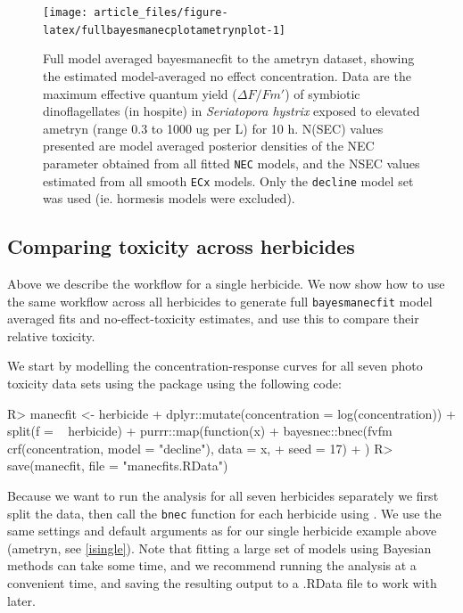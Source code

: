\documentclass[
  shortnames]{jss}
\begin{document}
\begin{CodeChunk}
\begin{figure}[!ht]

{\centering \texttt{[image: article\_files/figure-latex/fullbayesmanecplotametrynplot-1]} 

}

\caption{Full model averaged bayesmanecfit to the ametryn dataset, showing the estimated model-averaged no effect concentration. Data are the maximum effective quantum yield ($\Delta F / Fm'$) of symbiotic dinoflagellates (in hospite) in \textit{Seriatopora hystrix} exposed to elevated ametryn (range 0.3 to 1000 ug per L) for 10 h. N(SEC) values presented are model averaged posterior densities of the NEC parameter obtained from all fitted \texttt{NEC} models, and the NSEC values estimated from all smooth \texttt{ECx} models. Only the \texttt{decline} model set was used (ie. hormesis models were excluded).}\label{fig:fullbayesmanecplotametrynplot}
\end{figure}
\end{CodeChunk}

\subsection[Comparing toxicity]{Comparing toxicity across herbicides}\label{iall}

Above we describe the workflow for a single herbicide. We now show how to use the same workflow across all herbicides to generate full \texttt{bayesmanecfit} model averaged fits and no-effect-toxicity estimates, and use this to compare their relative toxicity.

We start by modelling the concentration-response curves for all seven photo toxicity data sets using the  package using the following code:

\begin{CodeChunk}
\begin{CodeInput}
R> manecfit <- herbicide %
+   dplyr::mutate(concentration = log(concentration)) %
+   split(f = ~ herbicide) %
+   purrr::map(function(x) {
+     bayesnec::bnec(fvfm ~ crf(concentration, model = "decline"), data = x,
+                    seed = 17)
+   })
R> save(manecfit, file = "manecfits.RData")
\end{CodeInput}
\end{CodeChunk}

Because we want to run the analysis for all seven herbicides separately we first split the data, then call the \texttt{bnec} function for each herbicide using  \citep{purrr}. We use the same settings and default arguments as for our single herbicide example above (ametryn, see \ref{isingle}). Note that fitting a large set of models using Bayesian methods can take some time, and we recommend running the analysis at a convenient time, and saving the resulting output to a .RData file to work with later.
\end{document}
